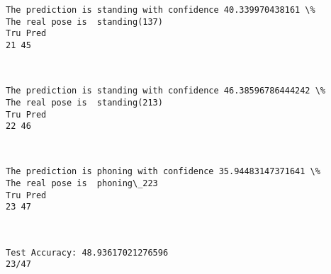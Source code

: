 \documentclass[11pt]{article}
\begin{document}
    \begin{Verbatim}[commandchars=\\\{\}]
The prediction is standing with confidence 40.339970438161 \%
The real pose is  standing(137)
Tru Pred
21 45

    \end{Verbatim}

    \begin{center}
    \end{center}
    { \hspace*{\fill} \\}
    
    \begin{Verbatim}[commandchars=\\\{\}]
The prediction is standing with confidence 46.38596786444242 \%
The real pose is  standing(213)
Tru Pred
22 46

    \end{Verbatim}

    \begin{center}
    \end{center}
    { \hspace*{\fill} \\}
    
    \begin{Verbatim}[commandchars=\\\{\}]
The prediction is phoning with confidence 35.94483147371641 \%
The real pose is  phoning\_223
Tru Pred
23 47

    \end{Verbatim}

    \begin{center}
    \end{center}
    { \hspace*{\fill} \\}
    
    \begin{Verbatim}[commandchars=\\\{\}]
Test Accuracy: 48.93617021276596
23/47

    \end{Verbatim}


    
    
    
    
\end{document}

